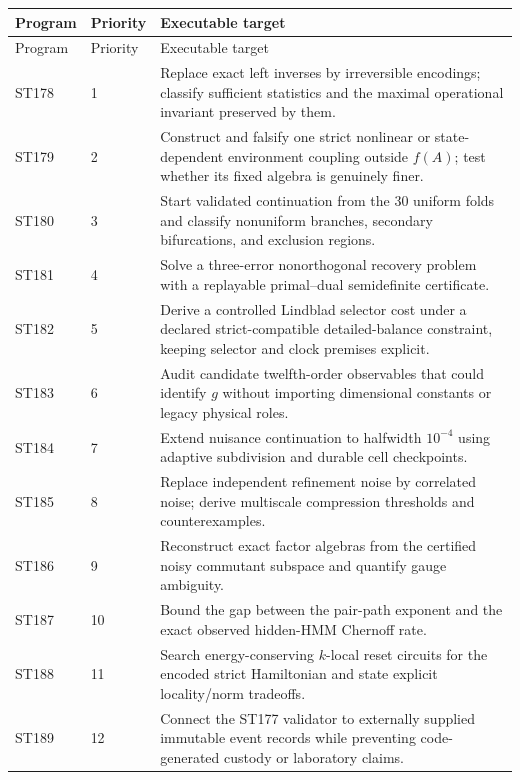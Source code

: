 \documentclass[11pt,a4paper]{article}
\begin{document}
\begin{longtable}{@{}p{}p{}p{}@{}}
\toprule Program & Priority & Executable target\\\midrule\endfirsthead
\toprule Program & Priority & Executable target\\\midrule\endhead
ST178 & 1 & Replace exact left inverses by irreversible encodings; classify sufficient statistics and the maximal operational invariant preserved by them.\\
ST179 & 2 & Construct and falsify one strict nonlinear or state-dependent environment coupling outside $f(A)$; test whether its fixed algebra is genuinely finer.\\
ST180 & 3 & Start validated continuation from the 30 uniform folds and classify nonuniform branches, secondary bifurcations, and exclusion regions.\\
ST181 & 4 & Solve a three-error nonorthogonal recovery problem with a replayable primal--dual semidefinite certificate.\\
ST182 & 5 & Derive a controlled Lindblad selector cost under a declared strict-compatible detailed-balance constraint, keeping selector and clock premises explicit.\\
ST183 & 6 & Audit candidate twelfth-order observables that could identify $g$ without importing dimensional constants or legacy physical roles.\\
ST184 & 7 & Extend nuisance continuation to halfwidth $10^{-4}$ using adaptive subdivision and durable cell checkpoints.\\
ST185 & 8 & Replace independent refinement noise by correlated noise; derive multiscale compression thresholds and counterexamples.\\
ST186 & 9 & Reconstruct exact factor algebras from the certified noisy commutant subspace and quantify gauge ambiguity.\\
ST187 & 10 & Bound the gap between the pair-path exponent and the exact observed hidden-HMM Chernoff rate.\\
ST188 & 11 & Search energy-conserving $k$-local reset circuits for the encoded strict Hamiltonian and state explicit locality/norm tradeoffs.\\
ST189 & 12 & Connect the ST177 validator to externally supplied immutable event records while preventing code-generated custody or laboratory claims.\\
\bottomrule
\end{longtable}
\end{document}
